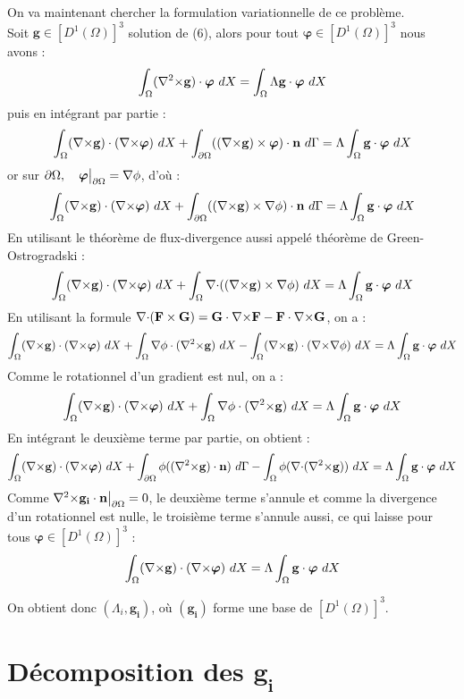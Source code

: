 On va maintenant chercher la formulation variationnelle de ce problème.\\
Soit $\mathbf{g}\in [D^1(\Omega)]^3$ solution de (6), alors pour tout $\bm{\varphi}\in [D^1(\Omega)]^3$ nous avons :
\[ \int_\Omega ({\nabla^2\times} \mathbf{g})\cdot\bm{\varphi}\ dX = \int_\Omega\Lambda \mathbf{g}\cdot\bm{\varphi}\ dX \]
puis en intégrant par partie :
\[ \int_\Omega ({\nabla\times} \mathbf{g})\cdot({\nabla\times}\bm{\varphi})\ dX + \int_{\partial\Omega} (({\nabla\times} \mathbf{g})\times \bm{\varphi})\cdot \mathbf{n}\ d\Gamma = \Lambda\int_\Omega \mathbf{g}\cdot\bm{\varphi}\ dX \]
or sur $\partial\Omega,\quad \bm{\varphi}{\big\rvert_{\partial\Omega}}={\nabla}\phi$, d'où :
\[ \int_\Omega ({\nabla\times} \mathbf{g})\cdot({\nabla\times}\bm{\varphi})\ dX + \int_{\partial\Omega} (({\nabla\times} \mathbf{g})\times {\nabla}\phi)\cdot \mathbf{n}\ d\Gamma = \Lambda\int_\Omega \mathbf{g}\cdot\bm{\varphi}\ dX \]
En utilisant le théorème de flux-divergence aussi appelé théorème de Green-Ostrogradski :
\[ \int_\Omega ({\nabla\times} \mathbf{g})\cdot({\nabla\times}\bm{\varphi})\ dX + \int_\Omega {\nabla\cdot}(({\nabla\times} \mathbf{g})\times {\nabla}\phi)\ dX = \Lambda\int_\Omega \mathbf{g}\cdot\bm{\varphi}\ dX \]
En utilisant la formule ${\nabla\cdot}(\mathbf{F}\times \mathbf{G}) = \mathbf{G}\cdot {\nabla\times} \mathbf{F} - \mathbf{F}\cdot {\nabla\times} \mathbf{G}$, on a :
\[ \int_\Omega (\rot \mathbf{g})\cdot(\rot\bm{\varphi})\ dX + \int_\Omega \grad\phi\cdot(\rott \mathbf{g})\ dX -\int_\Omega (\rot \mathbf{g})\cdot (\rot\grad\phi)\ dX  = \Lambda\int_\Omega \mathbf{g}\cdot\bm{\varphi}\ dX \]
Comme le rotationnel d'un gradient est nul, on a :
\[ \int_\Omega ({\nabla\times} \mathbf{g})\cdot({\nabla\times}\bm{\varphi})\ dX + \int_\Omega {\nabla}\phi\cdot({\nabla^2\times} \mathbf{g})\ dX  = \Lambda\int_\Omega \mathbf{g}\cdot\bm{\varphi}\ dX \]
En intégrant le deuxième terme par partie, on obtient :
\[ \int_\Omega ({\nabla\times} \mathbf{g})\cdot({\nabla\times}\bm{\varphi})\ dX + \int_{\partial\Omega} \phi(({\nabla^2\times} \mathbf{g})\cdot \mathbf{n})\ d\Gamma - \int_\Omega \phi({\nabla\cdot}({\nabla^2\times} \mathbf{g}))\ dX  = \Lambda\int_\Omega \mathbf{g}\cdot\bm{\varphi}\ dX \]
Comme ${\nabla^2\times}  \mathbf{g_i}\cdot \mathbf{n}{\big\rvert_{\partial\Omega}} = 0$, le deuxième terme s'annule et comme la divergence d'un rotationnel est nulle, le troisième terme s'annule aussi, ce qui laisse pour tous $\bm{\varphi}\in [D^1(\Omega)]^3$ :
\begin{equation}\label{fveigen}
\int_\Omega ({\nabla\times} \mathbf{g})\cdot({\nabla\times}\bm{\varphi})\ dX = \Lambda\int_\Omega \mathbf{g}\cdot\bm{\varphi}\ dX
\end{equation}

On obtient donc $(\Lambda_i,\mathbf{g_i})$, où $(\mathbf{g_i})$ forme une base de $[D^1(\Omega)]^3$.
\iffalse
\section{Décomposition des $\mathbf{g_i}$}
\label{decomp}

